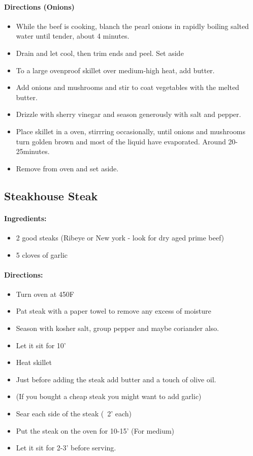 \documentclass{article}
\begin{document}
\paragraph{Directions (Onions)}
\begin{itemize}
\item While the beef is cooking, blanch the pearl onions in rapidly boiling salted water until tender, about 4 minutes. 
\item Drain and let cool, then trim ends and peel. Set aside
\item To a large ovenproof skillet over medium-high heat, add butter.
\item Add onions and mushrooms and stir to coat vegetables with the melted butter.
\item Drizzle with sherry vinegar and season generously with salt and pepper.
\item Place skillet in a oven, stirrring occasionally, until onions and mushrooms turn golden brown and most of the liquid have evaporated. Around 20-25minutes.
\item Remove from oven and set aside.
\end{itemize}

\subsection{Steakhouse Steak}

\paragraph{Ingredients:}

\begin{itemize}
	\item 2 good steaks (Ribeye or New york - look for dry aged prime beef)
	\item 5 cloves of garlic
\end{itemize}

\paragraph{Directions:}
\begin{itemize}
	\item Turn oven at 450F
	\item Pat steak with a paper towel to remove any excess of moisture
	\item Season with kosher salt, group pepper and maybe coriander also.
	\item Let it sit for 10'
	\item Heat skillet
	\item Just before adding the steak add butter and a touch of olive oil.
	\item (If you bought a cheap steak you might want to add garlic)
	\item Sear each side of the steak (~2' each)
	\item Put the steak on the oven for 10-15' (For medium)
	\item Let it sit for 2-3' before serving.
\end{itemize}
\end{document}
